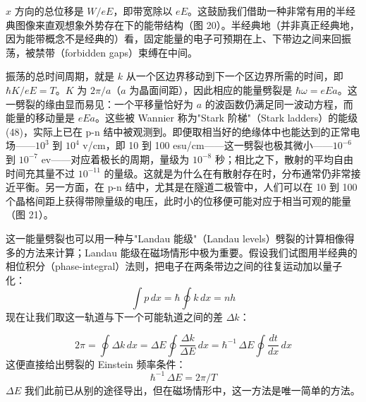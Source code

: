 $x$ 方向的总位移是 $W/eE$，即带宽除以 $eE$。这鼓励我们借助一种非常有用的半经典图像来直观想象外势存在下的能带结构（图 20）。半经典地（并非真正经典地，因为能带概念不是经典的）看，固定能量的电子可预期在上、下带边之间来回振荡，被禁带（forbidden gaps）束缚在中间。



振荡的总时间周期，就是 $k$ 从一个区边界移动到下一个区边界所需的时间，即 $\hbar K/eE = T$。$K$ 为 $2\pi/a$（$a$ 为晶面间距），因此相应的能量劈裂是 $\hbar\omega = eEa$。这一劈裂的缘由显而易见：一个平移量恰好为 $a$ 的波函数仍满足同一波动方程，而能量的移动量是 $eEa$。这些被 Wannier 称为"Stark 阶梯"（Stark ladders）的能级 (48)，实际上已在 p-n 结中被观测到。即便取相当好的绝缘体中也能达到的正常电场——$10^3$ 到 $10^4$ v/cm，即 10 到 100 esu/cm——这一劈裂也极其微小——$10^{-6}$ 到 $10^{-7}$ ev——对应着极长的周期，量级为 $10^{-8}$ 秒；相比之下，散射的平均自由时间充其量不过 $10^{-11}$ 的量级。这就是为什么在有散射存在时，分布通常仍非常接近平衡。另一方面，在 p-n 结中，尤其是在隧道二极管中，人们可以在 10 到 100 个晶格间距上获得带隙量级的电压，此时小的位移便可能对应于相当可观的能量（图 21）。


这一能量劈裂也可以用一种与"Landau 能级"（Landau levels）劈裂的计算相像得多的方法来计算；Landau 能级在磁场情形中极为重要。假设我们试图用半经典的相位积分（phase-integral）法则，把电子在两条带边之间的往复运动加以量子化：
\begin{equation*}
\int p\,dx = \hbar\oint k\,dx = nh
\end{equation*}
现在让我们取这一轨道与下一个可能轨道之间的差 $\Delta k$：


\begin{equation*}
2\pi = \oint \Delta k\,dx = \Delta E\oint \frac{\Delta k}{\Delta E}\,dx = \hbar^{-1}\,\Delta E\oint \frac{dt}{dx}\,dx
\end{equation*}
这便直接给出劈裂的 Einstein 频率条件：
\begin{equation*}
\hbar^{-1}\,\Delta E = 2\pi/T
\end{equation*}
$\Delta E$ 我们此前已从别的途径导出，但在磁场情形中，这一方法是唯一简单的方法。

